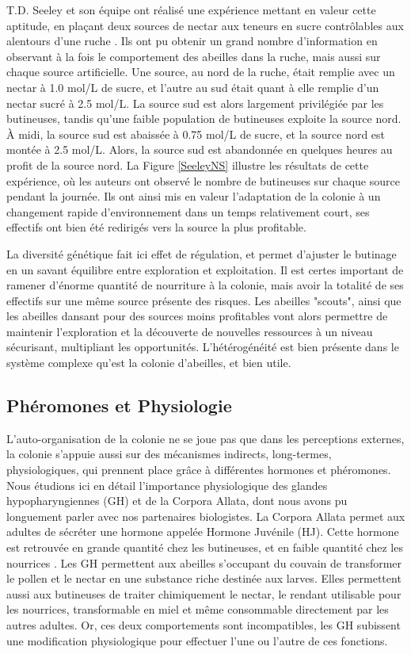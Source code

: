 			 T.D. Seeley et son équipe ont réalisé une expérience mettant en valeur cette aptitude, en plaçant deux sources de nectar aux teneurs en sucre contrôlables aux alentours d'une ruche \cite{seeley_collective_1991}. Ils ont pu obtenir un grand nombre d'information en observant à la fois le comportement des abeilles dans la ruche, mais aussi sur chaque source artificielle. Une source, au nord de la ruche, était remplie avec un nectar à 1.0 mol/L de sucre, et l'autre au sud était quant à elle remplie d'un nectar sucré à 2.5 mol/L. 
			La source sud est alors largement privilégiée par les butineuses, tandis qu'une faible population de butineuses exploite la source nord. À midi, la source sud est abaissée à 0.75 mol/L de sucre, et la source nord est montée à 2.5 mol/L. Alors, la source sud est abandonnée en quelques heures au profit de la source nord. La Figure \ref{SeeleyNS} illustre les résultats de cette expérience, où les auteurs ont observé le nombre de butineuses sur chaque source pendant la journée. Ils ont ainsi mis en valeur l'adaptation de la colonie à un changement rapide d'environnement dans un temps relativement court, ses effectifs ont bien été redirigés vers la source la plus profitable.
			
			La diversité génétique fait ici effet de régulation, et permet d'ajuster le butinage en un savant équilibre entre exploration et exploitation. Il est certes important de ramener d'énorme quantité de nourriture à la colonie, mais avoir la totalité de ses effectifs sur une même source présente des risques. Les abeilles "scouts", ainsi que les abeilles dansant pour des sources moins profitables vont alors permettre de maintenir l'exploration et la découverte de nouvelles ressources à un niveau sécurisant, multipliant les opportunités. L'hétérogénéité est bien présente dans le système complexe qu'est la colonie d'abeilles, et bien utile.
			
		\subsection{Phéromones et Physiologie}
			\label{subsubPhysio}
			L'auto-organisation de la colonie ne se joue pas que dans les perceptions externes, la colonie s'appuie aussi sur des mécanismes indirects, long-termes, physiologiques, qui prennent place grâce à différentes hormones et phéromones.  Nous étudions ici en détail l'importance physiologique des glandes hypopharyngiennes (GH) et de la Corpora Allata, dont nous avons pu longuement parler avec nos partenaires biologistes. La Corpora Allata permet aux adultes de sécréter une hormone appelée Hormone Juvénile (HJ). Cette hormone est retrouvée en grande quantité chez les butineuses, et en faible quantité chez les nourrices \cite{le_conte_primer_2001}. Les GH permettent aux abeilles s'occupant du couvain de transformer le pollen et le nectar en une substance riche destinée aux larves. Elles permettent aussi aux butineuses de traiter chimiquement le nectar, le rendant utilisable pour les nourrices, transformable en miel et même consommable directement par les autres adultes. Or, ces deux comportements sont incompatibles, les GH subissent une modification physiologique pour effectuer l'une ou l'autre de ces fonctions. 
			
